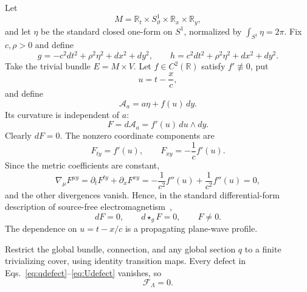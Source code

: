 \documentclass[10pt,oneside]{article}
\theoremstyle{plaincompact}
\theoremstyle{definitioncompact}
\newcommand{\R}{\mathbb R}
\newcommand{\Ad}{\mathcal A}
\newcommand{\cF}{\mathcal F}
\begin{document}
Let
\begin{equation}\label{eq:spacetime}
M=\R_t\times S^1_\vartheta\times\R_x\times\R_y,
\end{equation}
and let $\eta$ be the standard closed one-form on $S^1$, normalized by
$\int_{S^1}\eta=2\pi$.  Fix $c,\rho>0$ and define
\begin{equation}\label{eq:metrics}
g=-c^2dt^2+\rho^2\eta^2+dx^2+dy^2,
\qquad
h=c^2dt^2+\rho^2\eta^2+dx^2+dy^2.
\end{equation}
Take the trivial bundle $E=M\times V$.  Let $f\in C^2(\R)$ satisfy
$f'\not\equiv0$, put
\begin{equation}\label{eq:nullcoordinate}
u=t-\frac{x}{c},
\end{equation}
and define
\begin{equation}\label{eq:explicitconnection}
\Ad_a=a\eta+f(u)\,dy.
\end{equation}
Its curvature is independent of $a$:
\begin{equation}\label{eq:explicitF}
F=d\Ad_a=f'(u)\,du\wedge dy.
\end{equation}
Clearly $dF=0$.  The nonzero coordinate components are
\begin{equation}\label{eq:Fcomponents}
F_{ty}=f'(u),\qquad F_{xy}=-\frac1c f'(u).
\end{equation}
Since the metric coefficients are constant,
\begin{equation}\label{eq:maxwellcheck}
\nabla_\mu F^{\mu y}
=\partial_tF^{ty}+\partial_xF^{xy}
=-\frac1{c^2}f''(u)+\frac1{c^2}f''(u)=0,
\end{equation}
and the other divergences vanish.  Hence, in the standard differential-form
description of source-free electromagnetism~\cite{Wald},
\begin{equation}\label{eq:maxwell}
dF=0,\qquad d\star_gF=0,\qquad F\ne0.
\end{equation}
The dependence on $u=t-x/c$ is a propagating plane-wave profile.

Restrict the global bundle, connection, and any global section $q$ to a finite
trivializing cover, using identity transition maps.  Every defect in
Eqs.~\eqref{eq:qdefect}--\eqref{eq:Udefect} vanishes, so
\begin{equation}\label{eq:explicitgluing}
\cF_\Lambda=0.
\end{equation}
\end{document}
